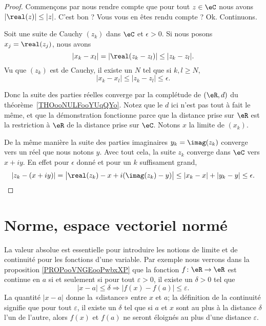 \begin{proof}
	Commençons par nous rendre compte que pour tout \( z\in \eC\) nous avons \( | \real(z) |\leq | z |\). C'est bon ? Vous vous en êtes rendu compte ? Ok. Continuons.

	Soit une suite de Cauchy \( (z_k)\) dans \( \eC\) et \( \epsilon>0\). Si nous posons \( x_j=\real(z_j)\), nous avons
	\begin{equation}
		| x_k-x_l |=| \real(z_k-z_l) |\leq | z_k-z_l |.
	\end{equation}
	Vu que \( (z_k)\) est de Cauchy, il existe un \( N\) tel que si \( k,l\geq N\),
	\begin{equation}
		| x_k-x_l |\leq | z_k-z_l |\leq \epsilon.
	\end{equation}

	Donc la suite des parties réelles converge par la complétude de \( (\eR,d)\) du théorème~\ref{THOooNULFooYUqQYo}. Notez que le \( d\) ici n'est pas tout à fait le même, et que la démonstration fonctionne parce que la distance prise sur \( \eR\) est la restriction à \( \eR\) de la distance prise sur \( \eC\). Notons \( x\) la limite de \( (x_k)\).

	De la même manière la suite des parties imaginaires \( y_k=\imag(z_k)\) converge vers un réel que nous notons \( y\). Avec tout cela, la suite \( z_k\) converge dans \( \eC\) vers \( x+iy\). En effet pour \( \epsilon\) donné et pour un \( k\) suffisament grand,
	\begin{equation}
		| z_k-(x+iy) |=\big| \real(z_k)-x+i(\imag(z_k)-y) \big|\leq | x_k-x |+| y_k-y |\leq \epsilon.
	\end{equation}
\end{proof}

\section{Norme, espace vectoriel normé}
\label{SECooWKJNooKOqpsx}

La valeur absolue est essentielle pour introduire les notions de limite et de continuité pour les fonctions d'une variable. Par exemple nous verrons dans la proposition \ref{PROPooVNGEooPwbxXP} que la fonction \( f\colon \eR\to \eR\) est continue en \( a\) si et seulement si pour tout \( \varepsilon > 0\), il existe un \( \delta > 0\) tel que
\begin{equation}
	| x-a |\leq\delta \Rightarrow | f(x)-f(a) |\leq \varepsilon.
\end{equation}
La quantité \( | x-a |\) donne la «distance» entre \( x\) et \( a\); la définition de la continuité signifie que pour tout \( \varepsilon\), il existe un \( \delta\) tel que si \( a\) et \( x\) sont au plus à la distance \( \delta\) l'un de l'autre, alors \( f(x)\) et \( f(a)\) ne seront éloignés au plus d'une distance \( \varepsilon\).

